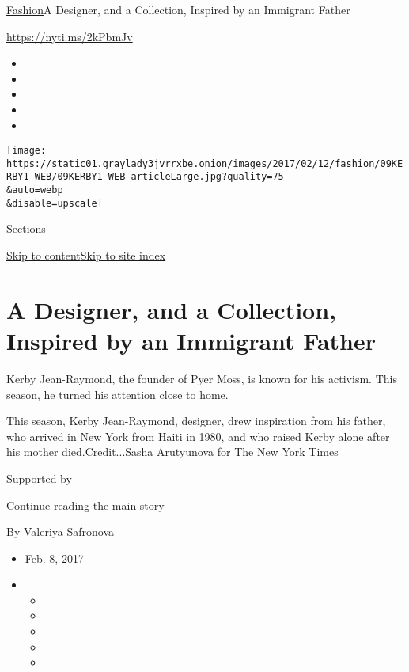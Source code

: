 \href{/section/fashion}{Fashion}\textbar{}A Designer, and a Collection,
Inspired by an Immigrant Father

\url{https://nyti.ms/2kPbmJv}

\begin{itemize}
\item
\item
\item
\item
\item
\end{itemize}

\texttt{[image: https://static01.graylady3jvrrxbe.onion/images/2017/02/12/fashion/09KERBY1-WEB/09KERBY1-WEB-articleLarge.jpg?quality=75\\\&auto=webp\\\&disable=upscale]}

Sections

\protect\hyperlink{site-content}{Skip to
content}\protect\hyperlink{site-index}{Skip to site index}

\hypertarget{a-designer-and-a-collection-inspired-by-an-immigrant-father}{%
\section{A Designer, and a Collection, Inspired by an Immigrant
Father}\label{a-designer-and-a-collection-inspired-by-an-immigrant-father}}

Kerby Jean-Raymond, the founder of Pyer Moss, is known for his activism.
This season, he turned his attention close to home.

This season, Kerby Jean-Raymond, designer, drew inspiration from his
father, who arrived in New York from Haiti in 1980, and who raised Kerby
alone after his mother died.Credit...Sasha Arutyunova for The New York
Times

Supported by

\protect\hyperlink{after-sponsor}{Continue reading the main story}

By Valeriya Safronova

\begin{itemize}
\item
  Feb. 8, 2017
\item
  \begin{itemize}
  \item
  \item
  \item
  \item
  \item
  \end{itemize}
\end{itemize}

